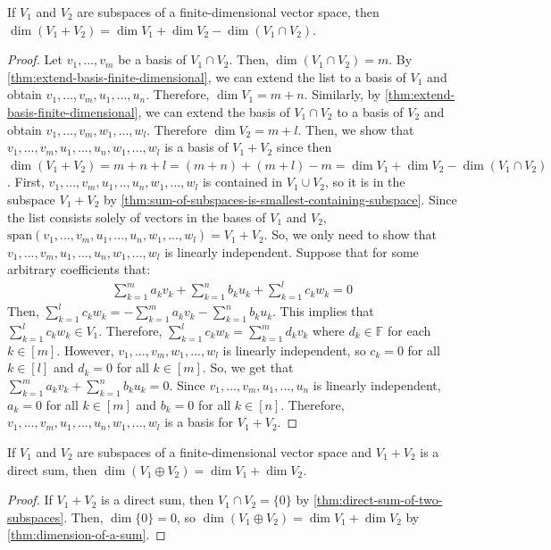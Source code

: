 \documentclass{article}
\begin{document}
\begin{theorem}
  \label{thm:dimension-of-a-sum}
  If $V_1$ and $V_2$ are subspaces of a finite-dimensional vector
  space, then $\dim (V_1 + V_2) = \dim V_1 + \dim V_2 - \dim (V_1 \cap
  V_2)$.
\end{theorem}
\begin{proof}
  Let $v_1, ..., v_m$ be a basis of $V_1 \cap V_2$. Then, $\dim(V_1
  \cap V_2) = m$. By \cref{thm:extend-basis-finite-dimensional}, we
  can extend the list to a basis of $V_1$ and obtain $v_1, ..., v_m,
  u_1, ..., u_n$. Therefore, $\dim V_1 = m + n$. Similarly, by
  \cref{thm:extend-basis-finite-dimensional}, we can extend the basis
  of $V_1 \cap V_2$ to a basis of $V_2$ and obtain $v_1, ..., v_m,
  w_1, ..., w_l$. Therefore $\dim V_2 = m + l$. Then, we show that
  $v_1, ..., v_m, u_1, ..., u_n, w_1, ..., w_l$ is a basis of $V_1 +
  V_2$ since then $\dim (V_1 + V_2) = m + n + l = (m + n) + (m + l) -
  m = \dim V_1 + \dim V_2 - \dim (V_1 \cap V_2)$. First, $v_1, ...,
  v_m, u_1, .., u_n, w_1, ..., w_l$ is contained in $V_1 \cup V_2$, so
  it is in the subspace $V_1 + V_2$ by
  \cref{thm:sum-of-subspaces-is-smallest-containing-subspace}. Since
  the list consists solely of vectors in the bases of $V_1$ and $V_2$,
  $\text{span}(v_1, ..., v_m, u_1, ..., u_n, w_1, ..., w_l) = V_1 +
  V_2$. So, we only need to show that $v_1, ..., v_m, u_1, ..., u_n,
  w_1, ..., w_l$ is linearly independent. Suppose that for some
  arbitrary coefficients that:
  \begin{align*}
    \sum_{k=1}^m a_k v_k + \sum_{k=1}^n b_k u_k + \sum_{k=1}^l c_k w_k
    = 0 
  \end{align*}
  Then, $\sum_{k=1}^l c_k w_k = -\sum_{k=1}^m a_k v_k - \sum_{k=1}^n
  b_k u_k$. This implies that $\sum_{k=1}^l c_k w_k \in
  V_1$. Therefore, $\sum_{k=1}^l c_k w_k = \sum_{k=1}^m d_k v_k$ where
  $d_k \in \mathbb{F}$ for each $k \in [m]$. However, $v_1, ..., v_m,
  w_1, ..., w_l$ is linearly independent, so $c_k = 0$ for all $k \in
  [l]$ and $d_k = 0$ for all $k \in [m]$. So, we get that
  $\sum_{k=1}^m a_k v_k + \sum_{k=1}^n b_k u_k = 0$. Since $v_1, ...,
  v_m, u_1, ..., u_n$ is linearly independent, $a_k = 0$ for all $k
  \in [m]$ and $b_k = 0$ for all $k \in [n]$. Therefore, $v_1, ...,
  v_m, u_1, ..., u_n, w_1, ..., w_l$ is a basis for $V_1 + V_2$. 
\end{proof}

\begin{corollary}
  \label{cor:dimension-of-direct-sum}
  If $V_1$ and $V_2$ are subspaces of a finite-dimensional vector
  space and $V_1 + V_2$ is a direct sum, then $\dim (V_1 \oplus V_2) =
  \dim V_1 + \dim V_2$.
\end{corollary}
\begin{proof}
  If $V_1 + V_2$ is a direct sum, then $V_1 \cap V_2 = \{0\}$ by
  \cref{thm:direct-sum-of-two-subspaces}. Then, $\dim \{0\} = 0$, so
  $\dim (V_1 \oplus V_2) = \dim V_1 + \dim V_2$ by
  \cref{thm:dimension-of-a-sum}.
\end{proof}
\end{document}
